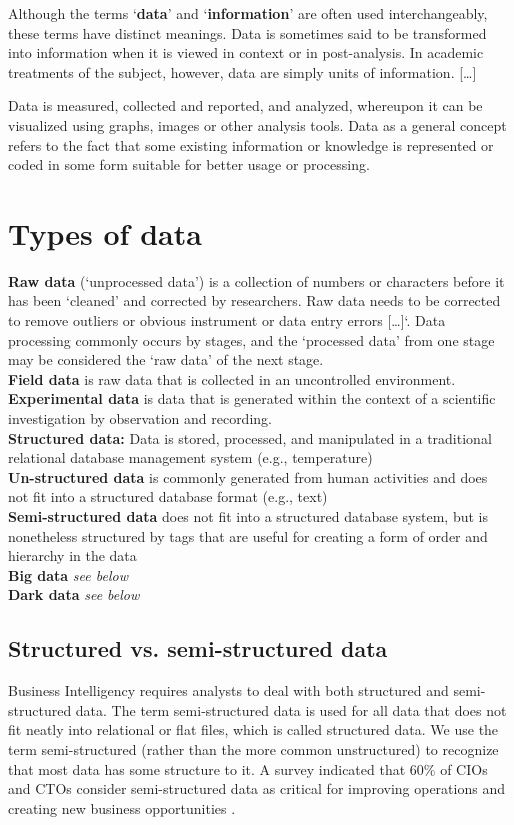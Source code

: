 Although the terms `\textbf{data}' and `\textbf{information}' are often used interchangeably, these terms have distinct meanings. Data is sometimes said to be transformed into information when it is viewed in context or in post-analysis. In academic treatments of the subject, however, data are simply units of information. [\dots]

Data is measured, collected and reported, and analyzed, whereupon it can be visualized using graphs, images or other analysis tools. Data as a general concept refers to the fact that some existing information or knowledge is represented or coded in some form suitable for better usage or processing. 




\pbn
\section{Types of data}

\textbf{Raw data} (`unprocessed data') is a collection of numbers or characters before it has been `cleaned' and corrected by researchers. Raw data needs to be corrected to remove outliers or obvious instrument or data entry errors [\dots]`. Data processing commonly occurs by stages, and the `processed data' from one stage may be considered the `raw data' of the next stage.\\
\textbf{Field data} is raw data that is collected in an uncontrolled environment.\\
\textbf{Experimental data} is data that is generated within the context of a scientific investigation by observation and recording.\\
\textbf{Structured data:} Data is stored, processed, and manipulated in a traditional relational
database management system (e.g., temperature)\\
\textbf{Un-structured data} is commonly generated from human activities and does not
fit into a structured database format (e.g., text)\\
\textbf{Semi-structured data} does not fit into a structured database system, but is
nonetheless structured by tags that are useful for creating a form of order and
hierarchy in the data\\
\textbf{Big data} \textit{see below}\\
\textbf{Dark data} \textit{see below}


\pbn
\subsection{Structured vs. semi-structured data}
Business Intelligency requires analysts to deal with both structured and semi-structured data. The term semi-structured data is used for all data that does not fit neatly into relational or flat files, which is called structured data.
We use the term semi-structured (rather than the more common unstructured) to recognize that most data has some structure to it. A survey indicated that 60\% of CIOs and CTOs consider semi-structured data as critical for improving operations and creating new business opportunities \citep{Blumberg2003Problem}.

